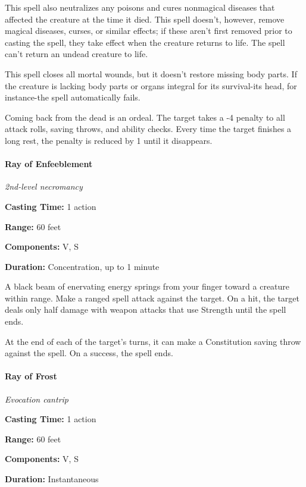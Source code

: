 \documentclass[
]{article}
\begin{document}
This spell also neutralizes any poisons and cures nonmagical diseases
that affected the creature at the time it died. This spell doesn't,
however, remove magical diseases, curses, or similar effects; if these
aren't first removed prior to casting the spell, they take effect when
the creature returns to life. The spell can't return an undead creature
to life.

This spell closes all mortal wounds, but it doesn't restore missing body
parts. If the creature is lacking body parts or organs integral for its
survival-its head, for instance-the spell automatically fails.

Coming back from the dead is an ordeal. The target takes a -4 penalty to
all attack rolls, saving throws, and ability checks. Every time the
target finishes a long rest, the penalty is reduced by 1 until it
disappears.

\hypertarget{ray-of-enfeeblement}{%
\paragraph{Ray of Enfeeblement}\label{ray-of-enfeeblement}}

\emph{2nd-level necromancy}

\textbf{Casting Time:} 1 action

\textbf{Range:} 60 feet

\textbf{Components:} V, S

\textbf{Duration:} Concentration, up to 1 minute

A black beam of enervating energy springs from your finger toward a
creature within range. Make a ranged spell attack against the target. On
a hit, the target deals only half damage with weapon attacks that use
Strength until the spell ends.

At the end of each of the target's turns, it can make a Constitution
saving throw against the spell. On a success, the spell ends.

\hypertarget{ray-of-frost}{%
\paragraph{Ray of Frost}\label{ray-of-frost}}

\emph{Evocation cantrip}

\textbf{Casting Time:} 1 action

\textbf{Range:} 60 feet

\textbf{Components:} V, S

\textbf{Duration:} Instantaneous
\end{document}
